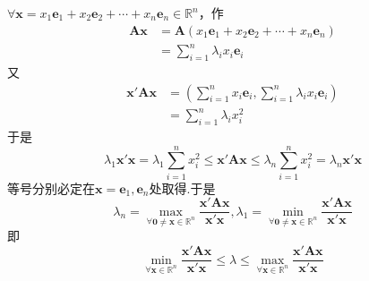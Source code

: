 $\forall\bm{x}=x_1\bm{e}_1+x_2\bm{e}_2+\cdots+x_n\bm{e}_n\in\mathbb{R}^n$，作\begin{align*}
    \bm{Ax} & =\bm{A}\left(
    x_1\bm{e}_1+x_2\bm{e}_2+\cdots+x_n\bm{e}_n
    \right)                                       \\
            & =\sum_{i=1}^{n}\lambda_ix_i\bm{e}_i
\end{align*}又\begin{align*}
    \bm{x}'\bm{Ax} & =\left(
    \sum_{i=1}^{n}x_i\bm{e}_i,\sum_{i=1}^{n}\lambda_ix_i\bm{e}_i
    \right)                                        \\
                   & =\sum_{i=1}^{n}\lambda_ix_i^2
\end{align*}于是\[
    \lambda_1\bm{x}'\bm{x}=\lambda_1\sum_{i=1}^{n}x_i^2\leqslant\bm{x}'\bm{Ax}\leqslant\lambda_n\sum_{i=1}^{n}x_i^2=\lambda_n\bm{x}'\bm{x}
\]等号分别必定在$\bm{x}=\bm{e}_1,\bm{e}_n$处取得.于是\[
    \lambda_n=\max_{\forall\bm{0}\neq\bm{x}\in\mathbb{R}^n}\frac{\bm{x}'\bm{Ax}}{\bm{x}'\bm{x}},\lambda_1=\min_{\forall\bm{0}\neq\bm{x}\in\mathbb{R}^n}\frac{\bm{x}'\bm{Ax}}{\bm{x}'\bm{x}}
\]即\[
    \min_{\forall\bm{x}\in\mathbb{R}^n}\frac{\bm{x}'\bm{Ax}}{\bm{x}'\bm{x}}\leqslant\lambda\leqslant\max_{\forall\bm{x}\in\mathbb{R}^n}\frac{\bm{x}'\bm{Ax}}{\bm{x}'\bm{x}}
\]
